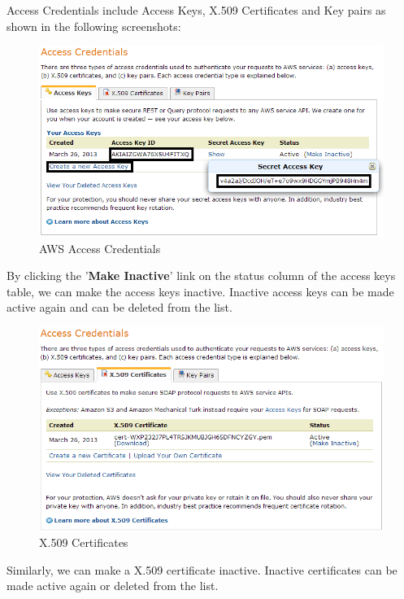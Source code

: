 Access Credentials include Access Keys, X.509 Certificates and Key pairs as shown in the following screenshots:
\begin{figure}[h]
  \centering
  \includegraphics[width=.8\textwidth]{figs/5163os_08_09.png}
  \caption{AWS Access Credentials}\label{fig:aws.access.credentials}
\end{figure} 

By clicking the '\textbf{Make Inactive}' link on the status column of the access keys table, we can make the access keys inactive. Inactive access keys can be made active again and can be deleted from the list.
\begin{figure}[h]
  \centering
  \includegraphics[width=.8\textwidth]{figs/5163os_08_11.png}
  \caption{X.509 Certificates}\label{fig:aws.x509certificates}
\end{figure} 

Similarly, we can make a X.509 certificate inactive. Inactive certificates can be made active again or deleted from the list.

